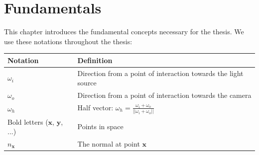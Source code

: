 \chapter{Fundamentals}
\label{chap:fundamentals}
This chapter introduces the fundamental concepts necessary for the thesis.
We use these notations throughout the thesis:
\begin{center}
    \begin{tabular}{ l  l }
        Notation & Definition \\
        \hline
        $\omega_i$ & Direction from a point of interaction towards the light source \\
        $\omega_o$ & Direction from a point of interaction towards the camera \\
        $\omega_h$ & Half vector: $\omega_h=\frac{\omega_i + \omega_o}{||\omega_i + \omega_o||}$ \\
        Bold letters ($\boldsymbol{x}$, $\boldsymbol{y}$, ...) & Points in space \\
        $n_{\boldsymbol{x}}$ & The normal at point $\boldsymbol{x}$ \\
    \end{tabular}
\end{center}

